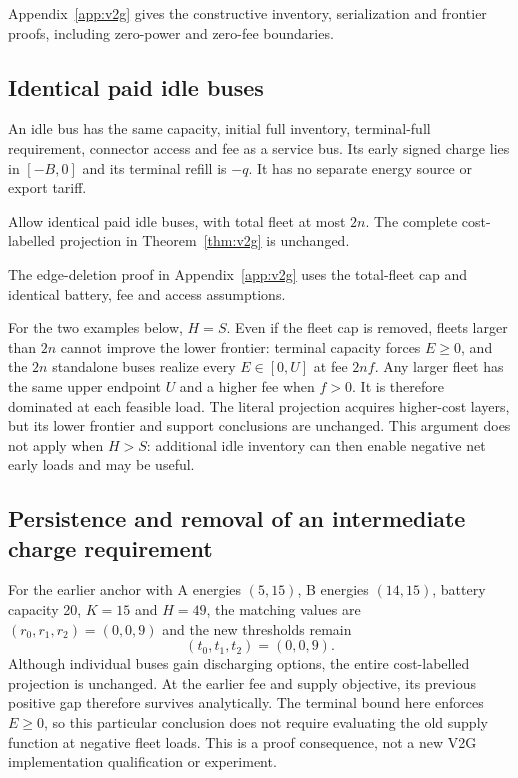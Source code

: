 Appendix~\ref{app:v2g} gives the constructive inventory, serialization and
frontier proofs, including zero-power and zero-fee boundaries.

\subsection{Identical paid idle buses}
An idle bus has the same capacity, initial full inventory, terminal-full
requirement, connector access and fee as a service bus. Its early signed
charge lies in $[-B,0]$ and its terminal refill is $-q$. It has no separate
energy source or export tariff.

\begin{proposition}\label{prop:v2gidle}
Allow identical paid idle buses, with total fleet at most $2n$. The complete
cost-labelled projection in Theorem~\ref{thm:v2g} is unchanged.
\end{proposition}
The edge-deletion proof in Appendix~\ref{app:v2g} uses the total-fleet cap
and identical battery, fee and access assumptions.

For the two examples below, $H=S$. Even if the fleet cap is removed,
fleets larger than $2n$ cannot improve the lower frontier: terminal
capacity forces $E\ge0$, and the $2n$ standalone buses realize every
$E\in[0,U]$ at fee $2nf$. Any larger fleet has the same upper endpoint
$U$ and a higher fee when $f>0$. It is therefore dominated at each
feasible load. The literal projection acquires higher-cost layers, but
its lower frontier and support conclusions are unchanged. This argument
does not apply when $H>S$: additional idle inventory can then enable
negative net early loads and may be useful.

\subsection{Persistence and removal of an intermediate charge requirement}
For the earlier anchor with A energies $(5,15)$, B energies $(14,15)$,
battery capacity 20, $K=15$ and $H=49$, the matching values are
$(r_0,r_1,r_2)=(0,0,9)$ and the new thresholds remain
\[
 (t_0,t_1,t_2)=(0,0,9).
\]
Although individual buses gain discharging options, the entire cost-labelled
projection is unchanged. At the earlier fee and supply objective, its
previous positive gap therefore survives analytically. The terminal bound
here enforces $E\ge0$, so this particular conclusion does not require
evaluating the old supply function at negative fleet loads. This is a proof
consequence, not a new V2G implementation qualification or experiment.

